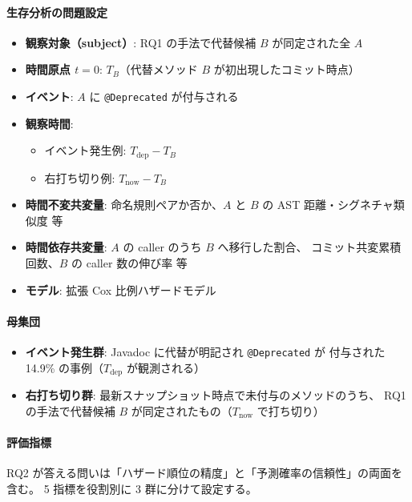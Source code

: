 \documentclass[a4paper,12pt]{article}
\begin{document}
\paragraph{生存分析の問題設定}
\begin{itemize}
  \item \textbf{観察対象（subject）}: RQ1 の手法で代替候補 $B$ が同定された全 $A$
  \item \textbf{時間原点 $t=0$}: $T_B$（代替メソッド $B$ が初出現したコミット時点）
  \item \textbf{イベント}: $A$ に \texttt{@Deprecated} が付与される
  \item \textbf{観察時間}:
    \begin{itemize}
      \item イベント発生例: $T_{\text{dep}} - T_B$
      \item 右打ち切り例: $T_{\text{now}} - T_B$
    \end{itemize}
  \item \textbf{時間不変共変量}: 命名規則ペアか否か、$A$ と $B$ の AST 距離・シグネチャ類似度 等
  \item \textbf{時間依存共変量}: $A$ の caller のうち $B$ へ移行した割合、
        コミット共変累積回数、$B$ の caller 数の伸び率 等
  \item \textbf{モデル}: 拡張 Cox 比例ハザードモデル
\end{itemize}

\paragraph{母集団}
\begin{itemize}
  \item \textbf{イベント発生群}: Javadoc に代替が明記され \texttt{@Deprecated} が
        付与された 14.9\% の事例（$T_{\text{dep}}$ が観測される）
  \item \textbf{右打ち切り群}: 最新スナップショット時点で未付与のメソッドのうち、
        RQ1 の手法で代替候補 $B$ が同定されたもの（$T_{\text{now}}$ で打ち切り）
\end{itemize}

\paragraph{評価指標}

RQ2 が答える問いは「ハザード順位の精度」と「予測確率の信頼性」の両面を含む。
5 指標を役割別に 3 群に分けて設定する。
\end{document}
